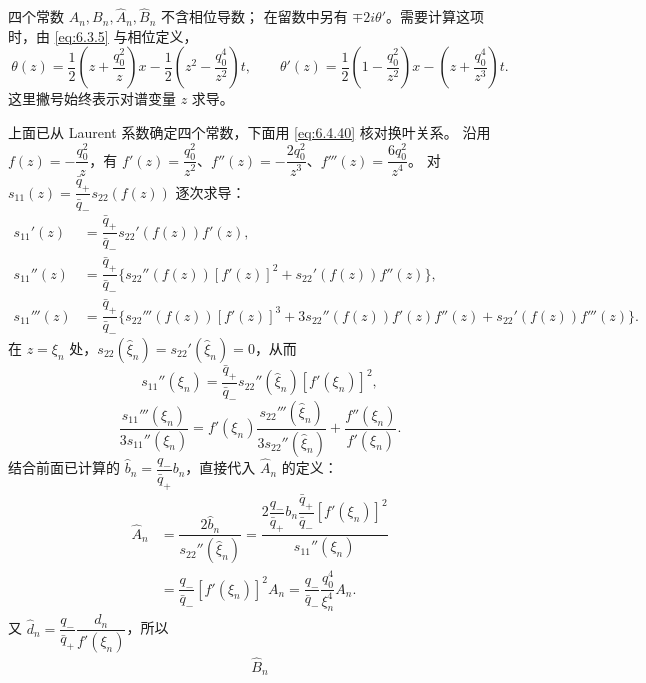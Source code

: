 \documentclass[lang=cn,scheme=chinese,mode=simple,device=normal,color=blue,
math=cm,thmcnt=section,12pt]{elegantbook}
\begin{document}
\begin{callout}
    四个常数 $A_n,B_n,\widehat A_n,\widehat B_n$ 不含相位导数；
    在留数中另有 $\mp2i\theta'$。需要计算这项时，由 \eqref{eq:6.3.5} 与相位定义，
    \[
        \theta(z)=\dfrac{1}{2}\left(z+\dfrac{q_0^2}{z}\right)x
        -\dfrac{1}{2}\left(z^2-\dfrac{q_0^4}{z^2}\right)t,\qquad
        \theta'(z)=\dfrac{1}{2}\left(1-\dfrac{q_0^2}{z^2}\right)x
        -\left(z+\dfrac{q_0^4}{z^3}\right)t.
    \]
    这里撇号始终表示对谱变量 $z$ 求导。
\end{callout}

\begin{callout}[计算：(6.9.6)--(6.9.9) 中四个常数的换叶关系]
    上面已从 Laurent 系数确定四个常数，下面用 \eqref{eq:6.4.40} 核对换叶关系。
    沿用 $f(z)=-\dfrac{q_0^2}{z}$，有
    $f'(z)=\dfrac{q_0^2}{z^2}$、$f''(z)=-\dfrac{2q_0^2}{z^3}$、$f'''(z)=\dfrac{6q_0^2}{z^4}$。
    对 $s_{11}(z)=\dfrac{\bar q_+}{\bar q_-}s_{22}(f(z))$ 逐次求导：
    \[
        \begin{aligned}
            s_{11}'(z)   & =\dfrac{\bar q_+}{\bar q_-}s_{22}'(f(z))f'(z), \\
            s_{11}''(z)  & =\dfrac{\bar q_+}{\bar q_-}
            \{s_{22}''(f(z))[f'(z)]^2+s_{22}'(f(z))f''(z)\},              \\
            s_{11}'''(z) & =\dfrac{\bar q_+}{\bar q_-}
            \{s_{22}'''(f(z))[f'(z)]^3+3s_{22}''(f(z))f'(z)f''(z)
            +s_{22}'(f(z))f'''(z)\}.
        \end{aligned}
    \]
    在 $z=\xi_n$ 处，$s_{22}(\widehat\xi_n)=s_{22}'(\widehat\xi_n)=0$，从而
    \[
        s_{11}''(\xi_n)=\dfrac{\bar q_+}{\bar q_-}s_{22}''(\widehat\xi_n)[f'(\xi_n)]^2,
    \]
    \[
        \dfrac{s_{11}'''(\xi_n)}{3s_{11}''(\xi_n)}
        =f'(\xi_n)\dfrac{s_{22}'''(\widehat\xi_n)}{3s_{22}''(\widehat\xi_n)}
        +\dfrac{f''(\xi_n)}{f'(\xi_n)}.
    \]
    结合前面已计算的 $\widehat b_n=\dfrac{q_-}{\bar q_+}b_n$，直接代入 $\widehat A_n$ 的定义：
    \[
        \begin{aligned}
            \widehat A_n
             & =\dfrac{2\widehat b_n}{s_{22}''(\widehat\xi_n)}
            =\dfrac{2\dfrac{q_-}{\bar q_+}b_n\dfrac{\bar q_+}{\bar q_-}[f'(\xi_n)]^2}{s_{11}''(\xi_n)} \\
             & =\dfrac{q_-}{\bar q_-}[f'(\xi_n)]^2A_n
            =\dfrac{q_-}{\bar q_-}\dfrac{q_0^4}{\xi_n^4}A_n.
        \end{aligned}
    \]
    又 $\widehat d_n=\dfrac{q_-}{\bar q_+}\dfrac{d_n}{f'(\xi_n)}$，所以
    \[
        \begin{aligned}
            \widehat B_n

\end{aligned}\]
\end{callout}
\end{document}

